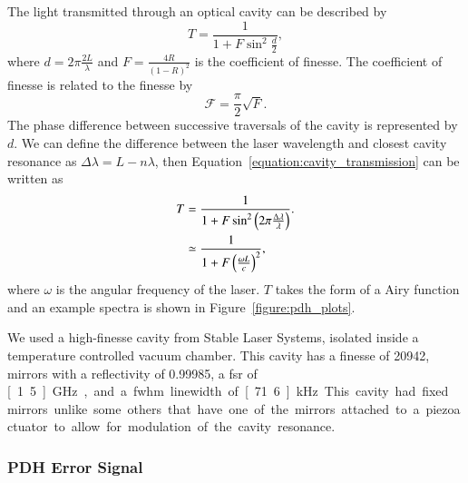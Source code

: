 The light transmitted through an optical cavity can be described by~\cite{pedrotti_introduction_2007}
\begin{equation}\label{equation:cavity_transmission}
T = \frac{1}{1+F\sin^2\frac{d}{2}},
\end{equation}
where $d=2\pi\frac{2L}{\lambda}$ and $F=\frac{4R}{\left(1-R\right)^2}$ is the coefficient of finesse.
The coefficient of finesse is related to the finesse by
\begin{equation}
\mathscr{F}=\frac{\pi}{2}\sqrt{F}.
\end{equation}
The phase difference between successive traversals of the cavity is represented by $d$.
We can define the difference between the laser wavelength and closest cavity resonance as $\Delta\lambda=L-n\lambda$, then Equation~\ref{equation:cavity_transmission} can be written as
\begin{align}\label{equation:cavity_transmission2}
T &= \frac{1}{1+F\sin^2\left(2\pi\frac{\Delta\lambda}{\lambda}\right)}. \notag \\
&\simeq \frac{1}{1+F\left(\frac{\omega L}{c}\right)^2},
\end{align}
where $\omega$ is the angular frequency of the laser.
$T$ takes the form of a Airy function and an example spectra is shown in Figure~\ref{figure:pdh_plots}.

We used a high-finesse cavity from Stable Laser Systems, isolated inside a temperature controlled vacuum chamber.
This cavity has a finesse of 20942, mirrors with a reflectivity of 0.99985, a \gls{fsr} of \unit[1.5]{GHz}, and a \gls{fwhm} linewidth of \unit[71.6]{kHz}.
This cavity had fixed mirrors unlike some others that have one of the mirrors attached to a piezoactuator to allow for modulation of the cavity resonance.

\subsubsection{PDH Error Signal}\label{section:pdh_error}

